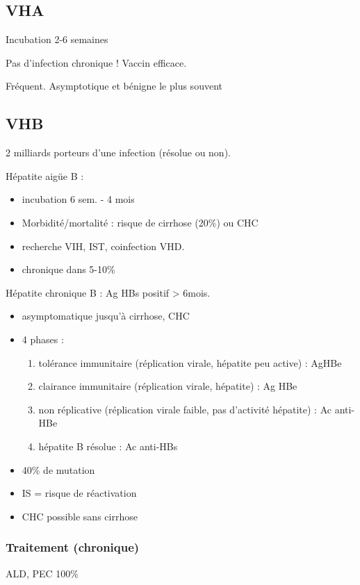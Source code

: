 \documentclass[11pt]{article}
\begin{document}
\subsection{VHA}
\label{sec:org2d6b308}
Incubation 2-6 semaines

Pas d'infection chronique !
Vaccin efficace.

Fréquent. Asymptotique et bénigne le plus souvent

\subsection{VHB}
\label{sec:org1948ad3}
2 milliards porteurs d'une infection (résolue ou non). 

Hépatite aigüe B :
\begin{itemize}
\item incubation 6 sem. - 4 mois
\item Morbidité/mortalité : risque de cirrhose (20\%) ou \gls{CHC}
\item \danger recherche VIH, IST, coinfection VHD.
\item chronique dans 5-10\%
\end{itemize}

Hépatite chronique B : Ag HBs positif > 6mois. 
\begin{itemize}
\item asymptomatique jusqu'à cirrhose, CHC
\item 4 phases :
\begin{enumerate}
\item tolérance immunitaire (réplication virale, hépatite peu active) : AgHBe
\item clairance immunitaire (réplication virale, hépatite) : Ag HBe
\item non réplicative (réplication virale faible, pas d'activité hépatite) : Ac
anti-HBe
\item hépatite B résolue : Ac anti-HBs
\end{enumerate}
\item 40\% de mutation
\item \gls{IS} = risque de réactivation 
\item CHC possible sans cirrhose \danger
\end{itemize}

\subsubsection{Traitement (chronique)}
\label{sec:orge24f5a4}
ALD, PEC 100\%
\end{document}

